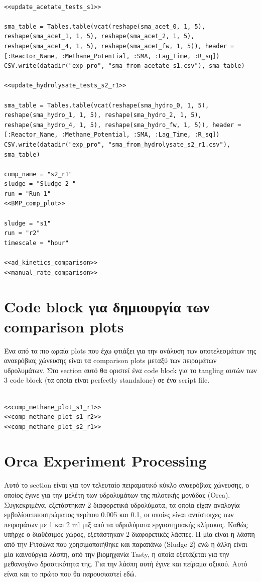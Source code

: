 \documentclass[11pt]{article}
\begin{document}
\begin{verbatim}

<<update_acetate_tests_s1>>

sma_table = Tables.table(vcat(reshape(sma_acet_0, 1, 5), reshape(sma_acet_1, 1, 5), reshape(sma_acet_2, 1, 5), reshape(sma_acet_4, 1, 5), reshape(sma_acet_fw, 1, 5)), header = [:Reactor_Name, :Methane_Potential, :SMA, :Lag_Time, :R_sq])
CSV.write(datadir("exp_pro", "sma_from_acetate_s1.csv"), sma_table)

<<update_hydrolysate_tests_s2_r1>>

sma_table = Tables.table(vcat(reshape(sma_hydro_0, 1, 5), reshape(sma_hydro_1, 1, 5), reshape(sma_hydro_2, 1, 5), reshape(sma_hydro_4, 1, 5), reshape(sma_hydro_fw, 1, 5)), header = [:Reactor_Name, :Methane_Potential, :SMA, :Lag_Time, :R_sq])
CSV.write(datadir("exp_pro", "sma_from_hydrolysate_s2_r1.csv"), sma_table)

comp_name = "s2_r1"
sludge = "Sludge 2 "
run = "Run 1"
<<BMP_comp_plot>>

sludge = "s1"
run = "r2"
timescale = "hour"

<<ad_kinetics_comparison>>
<<manual_rate_comparison>>
\end{verbatim}

\section{Code block για δημιουργία των comparison plots}
\label{sec:org29dd12f}
Ένα από τα πιο ωραία plots που έχω φτιάξει για την ανάλυση των αποτελεσμάτων της αναερόβιας χώνευσης είναι τα comparison plots μεταξύ των πειραμάτων υδρολυμάτων. Στο section αυτό θα οριστεί ένα code block για το tangling αυτών των 3 code block (τα οποία είναι perfectly standalone) σε ένα script file.

\begin{verbatim}

<<comp_methane_plot_s1_r1>>
<<comp_methane_plot_s1_r2>>
<<comp_methane_plot_s2_r1>>

\end{verbatim}

\section{Orca Experiment Processing}
\label{sec:org7cb5054}
Αυτό το section είναι για τον τελευταίο πειραματικό κύκλο αναερόβιας χώνευσης, ο οποίος έγινε για την μελέτη των υδρολυμάτων της πιλοτικής μονάδας (Orca). Συγκεκριμένα, εξετάστηκαν 2 διαφορετικά υδρολύματα, τα οποία είχαν αναλογία εμβολίου:υποστρώματος περίπου 0.005 και 0.1, οι οποίες είναι αντίστοιχες των πειραμάτων με 1 και 2 ml μιξ από τα υδρολύματα εργαστηριακής κλίμακας. Καθώς υπήρχε ο διαθέσιμος χώρος, εξετάστηκαν 2 διαφορετικές λάσπες. Η μία είναι η λάσπη από την Ριτσώνα που χρησιμοποιήθηκε και παραπάνω (Sludge 2) ενώ η άλλη είναι μία καινούργια λάσπη, από την βιομηχανία Tasty, η οποία εξετάζεται για την μεθανογόνο δραστικότητα της. Για την λάσπη αυτή έγινε και πείραμα οξικού. Αυτό είναι και το πρώτο που θα παρουσιαστεί εδώ.
\end{document}
